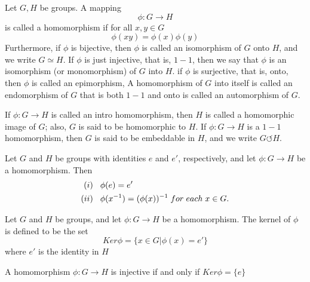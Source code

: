\begin{defi}
    Let $G,H$ be groups. A mapping\begin{equation*}
        \phi:G\rightarrow H
    \end{equation*}
    is called a homomorphism if for all $x,y\in G$
    \begin{equation*}
        \phi(xy)=\phi(x)\phi(y)
    \end{equation*}
    Furthermore, if $\phi$ is bijective, then $\phi$ is called an isomorphism of $G$ onto $H$, and we write $G\simeq H$. If $\phi$ is just injective, that is, $1-1$, then we say that $\phi$ is an isomorphism (or monomorphism) of $G$ into $H$. if $\phi$ is surjective, that is, onto, then $\phi$ is called an epimorphism, A homomorphism of $G$ into itself is called an endomorphism of $G$ that is both $1-1$ and onto is called an automorphism of $G$.

    If $\phi:G\rightarrow H$ is called an intro homomorphism, then $H$ is called a homomorphic image of $G$; also, $G$ is said to be homomorphic to $H$. If $\phi:G\rightarrow H$ is a $1-1$ homomorphism, then $G$ is said to be embeddable in $H$, and we write $G\circlearrowleft H$.
\end{defi}
\begin{teo}
    Let $G$ and $H$ be groups with identities $e$ and $e'$, respectively, and let $\phi:G\rightarrow H$ be a homomorphism. Then
    \begin{align*}
        (i)&\hspace{.3cm} \phi(e)=e'\\
        (ii)&\hspace{.3cm}\phi(x^{-1})=(\phi(x))^{-1}\hspace{.1cm}for\hspace{.1cm}each\hspace{.1cm}x\in G.
    \end{align*}
\end{teo}
\begin{defi}
    Let $G$ and $H$ be groups, and let $\phi:G\rightarrow H$ be a homomorphism. The kernel of $\phi$ is defined to be the set\begin{equation*}
        Ker\phi=\{x\in G|\phi(x)=e'\}
    \end{equation*}
    where $e'$ is the identity in $H$
\end{defi}
\begin{teo}
    A homomorphism $\phi:G\rightarrow H$ is injective if and only if $Ker\phi=\{e\}$
\end{teo}